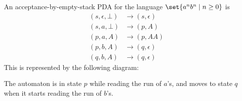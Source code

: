 \begin{example}
    An acceptance-by-empty-stack PDA for the language
    $\set{a^n b^n \mid n \ge 0}$ is \begin{align*}
        (s, \epsilon, \bot) &\to (s, \epsilon) \\
        (s, a, \bot) &\to (p, A) \\
        (p, a, A) &\to (p, AA) \\
        (p, b, A) &\to (q, \epsilon) \\
        (q, b, A) &\to (q, \epsilon)
    \end{align*}
    This is represented by the following diagram:
    \begin{center}
    \end{center}
    The automaton is in state $p$ while reading the run of $a$'s,
    and moves to state $q$ when it starts reading the run of $b$'s.
\end{example}

